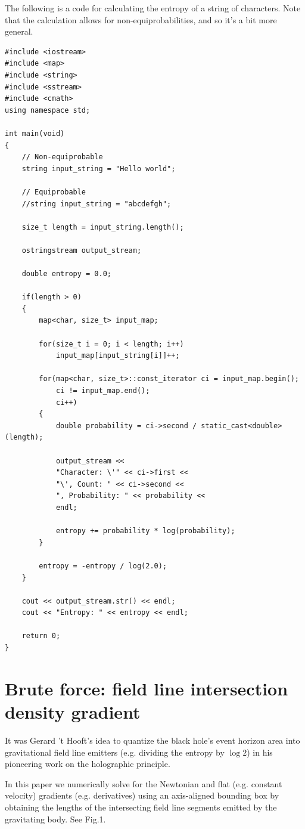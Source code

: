 \documentclass[12pt]{article}
\begin{document}
The following is a code for calculating the entropy of a string of characters.
Note that the calculation allows for non-equiprobabilities, and so it's a bit more general.
\begin{lstlisting}
#include <iostream>
#include <map>
#include <string>
#include <sstream>
#include <cmath>
using namespace std;

int main(void)
{
    // Non-equiprobable
    string input_string = "Hello world";

    // Equiprobable
    //string input_string = "abcdefgh";

    size_t length = input_string.length();

    ostringstream output_stream;
    
    double entropy = 0.0;
    
    if(length > 0)
    {
        map<char, size_t> input_map;

        for(size_t i = 0; i < length; i++)
            input_map[input_string[i]]++;
        
        for(map<char, size_t>::const_iterator ci = input_map.begin(); 
			ci != input_map.end(); 
			ci++)
        {
            double probability = ci->second / static_cast<double>(length);
            
            output_stream << 
			"Character: \'" << ci->first << 
			"\', Count: " << ci->second << 
			", Probability: " << probability << 
			endl;
            
            entropy += probability * log(probability);
        }
        
        entropy = -entropy / log(2.0);
    }

    cout << output_stream.str() << endl;
    cout << "Entropy: " << entropy << endl;
    
    return 0;
}

\end{lstlisting}




\section{Brute force: field line intersection density gradient}

It was Gerard 't Hooft's idea to quantize the black hole's event horizon area into gravitational field line emitters (e.g. dividing the entropy by $\log 2$) in his pioneering work on the holographic principle.

In this paper we numerically solve for the Newtonian and flat (e.g. constant velocity) gradients (e.g. derivatives) using an axis-aligned bounding box by obtaining the lengths of the intersecting field line segments emitted by the gravitating body. See Fig.1. 
\end{document}
